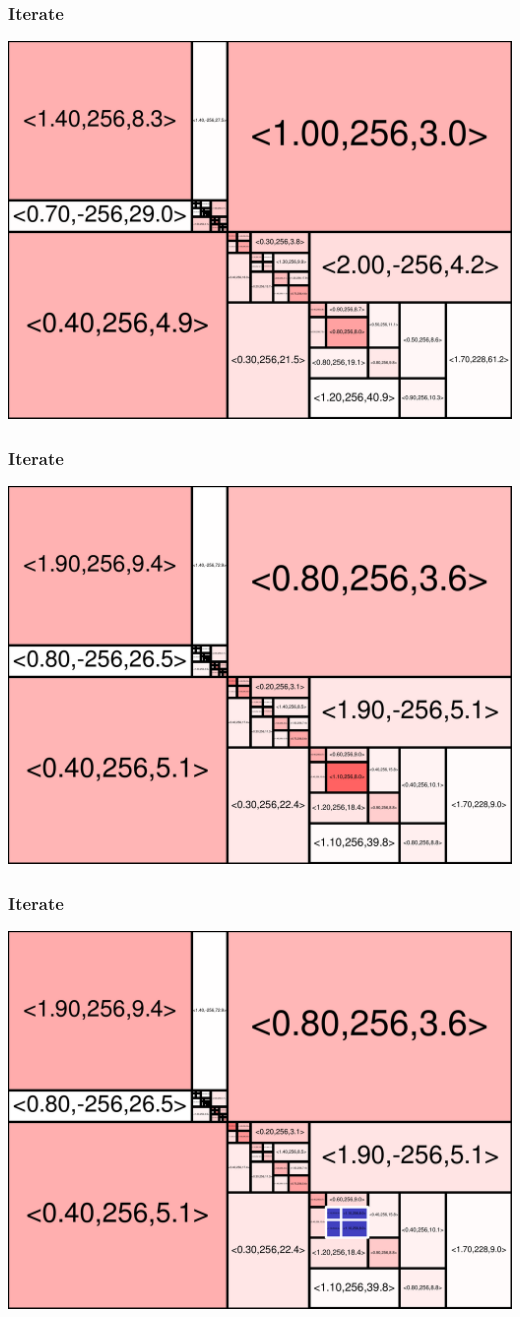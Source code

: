 \begin{frame}
\frametitle{Iterate}\begin{centering}\includegraphics[width=8.5 cm]{remy-graph/graph/test63.pdf}

\end{centering}\end{frame}


\begin{frame}
\frametitle{Iterate}\begin{centering}\includegraphics[width=8.5 cm]{remy-graph/graph/test64.pdf}

\end{centering}\end{frame}


\begin{frame}
\frametitle{Iterate}\begin{centering}\includegraphics[width=8.5 cm]{remy-graph/graph/test65.pdf}

\end{centering}\end{frame}


